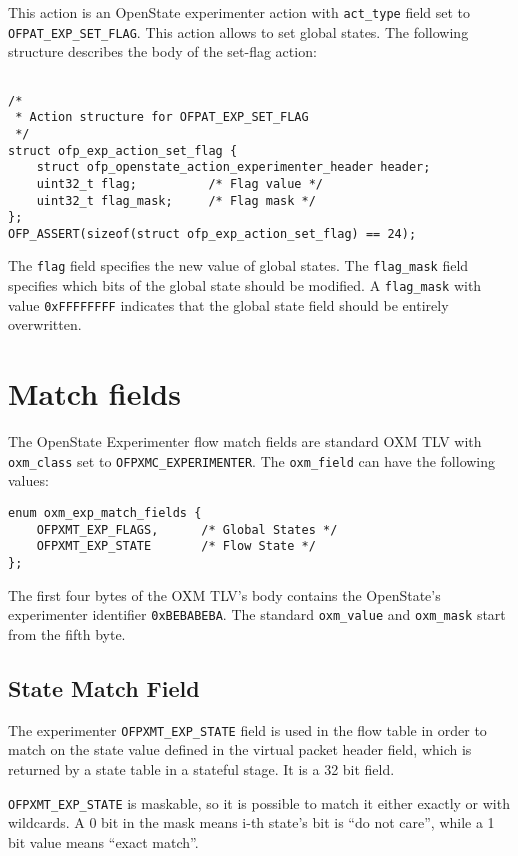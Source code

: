 This action is an OpenState experimenter action with \texttt{act\_type} field set to \texttt{OFPAT\_EXP\_SET\_FLAG}. This action allows to set global states. The following structure describes the body of the set-flag action:

\begin{verbatim}

/*
 * Action structure for OFPAT_EXP_SET_FLAG
 */
struct ofp_exp_action_set_flag {
    struct ofp_openstate_action_experimenter_header header;
    uint32_t flag;          /* Flag value */
    uint32_t flag_mask;     /* Flag mask */
};
OFP_ASSERT(sizeof(struct ofp_exp_action_set_flag) == 24);
\end{verbatim}
The \texttt{flag} field specifies the new value of global states. The \texttt{flag\_mask} field specifies which bits of the global state should be modified. A \texttt{flag\_mask} with value \texttt{0xFFFFFFFF} indicates that the global state field should be entirely overwritten.

\section{Match fields}

The OpenState Experimenter flow match fields are standard OXM TLV with \texttt{oxm\_class} set to \texttt{OFPXMC\_EXPERIMENTER}. The \texttt{oxm\_field} can have the following values:

\begin{verbatim}
enum oxm_exp_match_fields {
    OFPXMT_EXP_FLAGS,      /* Global States */
    OFPXMT_EXP_STATE       /* Flow State */
};
\end{verbatim}
The first four bytes of the OXM TLV’s body contains the OpenState's experimenter identifier \texttt{0xBEBABEBA}. The standard \texttt{oxm\_value} and \texttt{oxm\_mask} start from the fifth byte.

\subsection{State Match Field}
\label{sec:match_state}

The experimenter \texttt{OFPXMT\_EXP\_STATE} field is used in the flow table in order to match on the state value defined in the virtual packet header field, which is returned by a state table in a stateful stage. It is a 32 bit field.

\texttt{OFPXMT\_EXP\_STATE} is maskable, so it is possible to match it either exactly or with wildcards. A 0 bit in the mask means i-th state's bit is ``do not care'', while a 1 bit value means ``exact match''.

